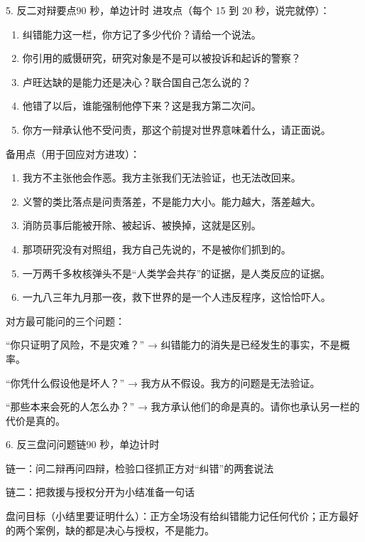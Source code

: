 \documentclass[script,con]{debate}
\begin{document}
\begin{stage}{5. 反二对辩要点}{90 秒，单边计时}
进攻点（每个 15 到 20 秒，说完就停）：

\begin{enumerate}[leftmargin=1.8em,itemsep=2pt,topsep=2pt]
\item 纠错能力这一栏，你方记了多少代价？请给一个说法。
\item 你引用的威慑研究，研究对象是不是可以被投诉和起诉的警察？
\item 卢旺达缺的是能力还是决心？联合国自己怎么说的？
\item 他错了以后，谁能强制他停下来？这是我方第二次问。
\item 你方一辩承认他不受问责，那这个前提对世界意味着什么，请正面说。
\end{enumerate}
备用点（用于回应对方进攻）：

\begin{enumerate}[leftmargin=1.8em,itemsep=2pt,topsep=2pt]
\item 我方不主张他会作恶。我方主张我们无法验证，也无法改回来。
\item 义警的类比落点是问责落差，不是能力大小。能力越大，落差越大。
\item 消防员事后能被开除、被起诉、被换掉，这就是区别。
\item 那项研究没有对照组，我方自己先说的，不是被你们抓到的。
\item 一万两千多枚核弹头不是“人类学会共存”的证据，是人类反应的证据。
\item 一九八三年九月那一夜，救下世界的是一个人违反程序，这恰恰吓人。
\end{enumerate}
对方最可能问的三个问题：

\begin{bullets}
\item “你只证明了风险，不是灾难？” → 纠错能力的消失是已经发生的事实，不是概率。
\item “你凭什么假设他是坏人？” → 我方从不假设。我方的问题是无法验证。
\item “那些本来会死的人怎么办？” → 我方承认他们的命是真的。请你也承认另一栏的代价是真的。
\end{bullets}
\end{stage}
\begin{stage}{6. 反三盘问问题链}{90 秒，单边计时}
\begin{chain}{链一：问二辩再问四辩，检验口径}{抓正方对“纠错”的两套说法}
\end{chain}
\begin{chain}{链二：把救援与授权分开}{为小结准备一句话}
\end{chain}
盘问目标（小结里要证明什么）：正方全场没有给纠错能力记任何代价；正方最好的两个案例，缺的都是决心与授权，不是能力。

\end{stage}
\end{document}
